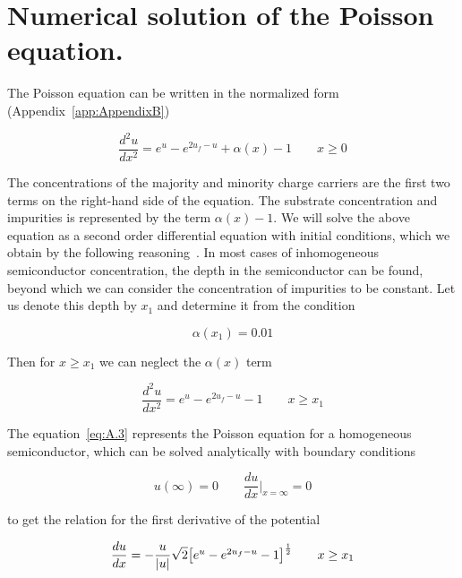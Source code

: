 
\chapter{Numerical solution of the Poisson equation.}\label{app:AppendixA}
\raggedright{}

The Poisson equation can be written in the normalized form
(Appendix~\ref{app:AppendixB})

\begin{equation}\label{eq:A.1}
  \frac{d^2u}{dx^2} = e^u - e^{2u_f-u} + \alpha(x) - 1 \qquad {x\ge0}
\end{equation}

The concentrations of the majority and minority charge carriers are
the first two terms on the right-hand side of the equation. The
substrate concentration and impurities is represented by the term
$\alpha(x)-1$. We will solve the above equation as a second order
differential equation with initial conditions, which we obtain by the
following reasoning~\cite{App.1}. In most cases of inhomogeneous
semiconductor concentration, the depth in the semiconductor can be
found, beyond which we can consider the concentration of impurities to
be constant. Let us denote this depth by $x_1$ and determine it from
the condition

\begin{equation}\label{eq:A.2}
  \alpha(x_1) = 0.01
\end{equation}

Then for $x\ge{x_1}$ we can neglect the $\alpha(x)$ term

\begin{equation}\label{eq:A.3}
  \frac{d^2u}{dx^2} = e^u - e^{2u_f-u} - 1 \qquad {x\ge{x_1}}
\end{equation}

The equation~\ref{eq:A.3} represents the Poisson equation for a
homogeneous semiconductor, which can be solved analytically with
boundary conditions

\begin{equation}\label{eq:A.4}
  u(\infty) = 0 \qquad \frac{du}{dx}\Big\rvert_{x=\infty} = 0
\end{equation}

to get the relation for the first derivative of the potential

\begin{equation}\label{eq:A.5}
  \frac{du}{dx} = - \frac{u}{|u|} \sqrt{2} \big{[e^u - e^{2u_f-u} - 1 \big]}^{\frac{1}{2}} \qquad {x\ge{x_1}}
\end{equation}

